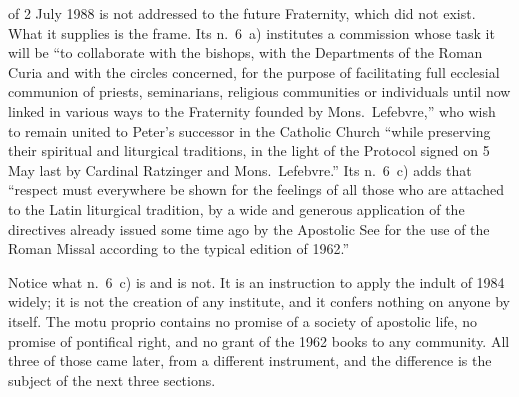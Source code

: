  of 2 July 1988 is not addressed to the future
Fraternity, which did not exist. What it supplies is the frame. Its
n.~6~a) institutes a commission whose task it will be ``to collaborate
with the bishops, with the Departments of the Roman Curia and with the
circles concerned, for the purpose of facilitating full ecclesial
communion of priests, seminarians, religious communities or individuals
until now linked in various ways to the Fraternity founded by
Mons.\ Lefebvre,'' who wish to remain united to Peter's successor in the
Catholic Church ``while preserving their spiritual and liturgical
traditions, in the light of the Protocol signed on 5 May last by Cardinal
Ratzinger and Mons.\ Lefebvre.'' Its n.~6~c) adds that ``respect must
everywhere be shown for the feelings of all those who are attached to the
Latin liturgical tradition, by a wide and generous application of the
directives already issued some time ago by the Apostolic See for the use
of the Roman Missal according to the typical edition of 1962.''

Notice what n.~6~c) is and is not. It is an instruction to apply the
indult of 1984 widely; it is not the creation of any institute, and it
confers nothing on anyone by itself. The motu proprio contains no promise
of a society of apostolic life, no promise of pontifical right, and no
grant of the 1962 books to any community. All three of those came later,
from a different instrument, and the difference is the subject of the
next three sections.
